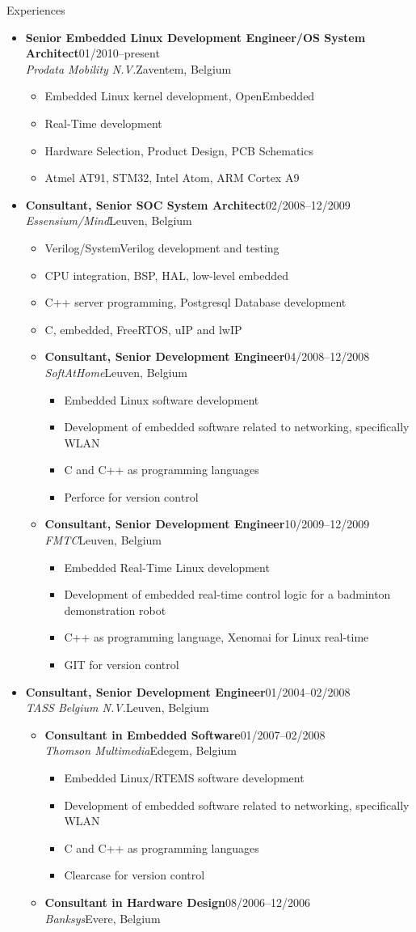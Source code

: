 \documentclass[12pt,oneside]{article}
\newenvironment{ressection}[1]{
	\vspace{5pt}
	{\selectfont\Large#1}
	\begin{itemize}
	\vspace{5pt}
}{
	\end{itemize}
}
\newcommand{\ressubitem}[1]{
	\vspace{-4pt}
	\item \begin{flushleft} #1 \end{flushleft}
}
\newcommand{\resbigitem}[4]{
	\vspace{-5pt}
	\item
	\textbf{#1}\hfill#4 \\
	\textit{#2}\hfill#3
}
\newenvironment{ressubsec}[4]{
	\resbigitem{#1}{#2}{#3}{#4}
	\vspace{-2pt}
	\begin{itemize}
}{
	\end{itemize}
}
\newenvironment{ressubsubsec}[4]{
	\vspace{5pt}
	\resbigitem{#1}{#2}{#3}{#4}
	\begin{itemize}
}{
	\end{itemize}
}
\newcommand{\ressubsubitem}[1]{
	\vspace{-1pt}
	\item \begin{flushleft} #1 \end{flushleft}
}
\begin{document}
\begin{ressection}{Experiences}
	\begin{ressubsec}{Senior Embedded Linux Development Engineer/OS System Architect}{Prodata Mobility N.V.}{Zaventem, Belgium}{01/2010--present}
		\ressubsubitem{Embedded Linux kernel development, OpenEmbedded}
		\ressubsubitem{Real-Time development}
		\ressubsubitem{Hardware Selection, Product Design, PCB Schematics}
		\ressubsubitem{Atmel AT91, STM32, Intel Atom, ARM Cortex A9}
	\end{ressubsec}
	\begin{ressubsec}{Consultant, Senior SOC System Architect}{Essensium/Mind}{Leuven, Belgium}{02/2008--12/2009}
		\ressubitem{Verilog/SystemVerilog development and testing}
		\ressubitem{CPU integration, BSP, HAL, low-level embedded}
		\ressubitem{C++ server programming, Postgresql Database development}
		\ressubitem{C, embedded, FreeRTOS, uIP and lwIP}
		\begin{ressubsubsec}{Consultant, Senior Development Engineer}{SoftAtHome}{Leuven, Belgium}{04/2008--12/2008}
			\ressubsubitem{Embedded Linux software development}
			\ressubsubitem{Development of embedded software related to networking, specifically WLAN}
			\ressubsubitem{C and C++ as programming languages}
			\ressubsubitem{Perforce for version control}
		\end{ressubsubsec}
		\begin{ressubsubsec}{Consultant, Senior Development Engineer}{FMTC}{Leuven, Belgium}{10/2009--12/2009}
			\ressubsubitem{Embedded Real-Time Linux development}
			\ressubsubitem{Development of embedded real-time control logic for a badminton demonstration robot}
			\ressubsubitem{C++ as programming language, Xenomai for Linux real-time}
			\ressubsubitem{GIT for version control}
		\end{ressubsubsec}
	\end{ressubsec}
	\begin{ressubsec}{Consultant, Senior Development Engineer}{TASS Belgium N.V.}{Leuven, Belgium}{01/2004--02/2008}
		\begin{ressubsubsec}{Consultant in Embedded Software}{Thomson Multimedia}{Edegem, Belgium}{01/2007--02/2008}
			\ressubsubitem{Embedded Linux/RTEMS software development}
			\ressubsubitem{Development of embedded software related to networking, specifically WLAN}
			\ressubsubitem{C and C++ as programming languages}
			\ressubsubitem{Clearcase for version control}
		\end{ressubsubsec}
		\begin{ressubsubsec}{Consultant in Hardware Design}{Banksys}{Evere, Belgium}{08/2006--12/2006}

\end{ressubsubsec}
\end{ressubsec}
\end{ressection}
\end{document}
